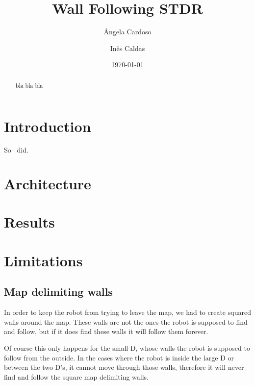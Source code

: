 \documentclass[12pt,a4paper,reqno]{article}
\numberwithin{figure}{section}
\numberwithin{equation}{section}
\begin{document}
\title{Wall Following STDR}

\author{\^{A}ngela Cardoso}
\author{In\^{e}s Caldas}
\date{\today}

\maketitle

\begin{abstract}
bla bla bla
\end{abstract}

\tableofcontents

\section{Introduction}

So~\cite{Trahtman:2009} did.


\section{Architecture}

\section{Results}

\section{Limitations}

\subsection{Map delimiting walls}

In order to keep the robot from trying to leave the map, we had to create squared walls around the map. These walls are not the ones the robot is supposed to find and follow, but if it does find these walls it will follow them forever.

Of course this only happens for the small D, whose walls the robot is supposed to follow from the outside. In the cases where the robot is inside the large D or between the two D's, it cannot move through those walls, therefore it will never find and follow the square map delimiting walls.
\end{document}
